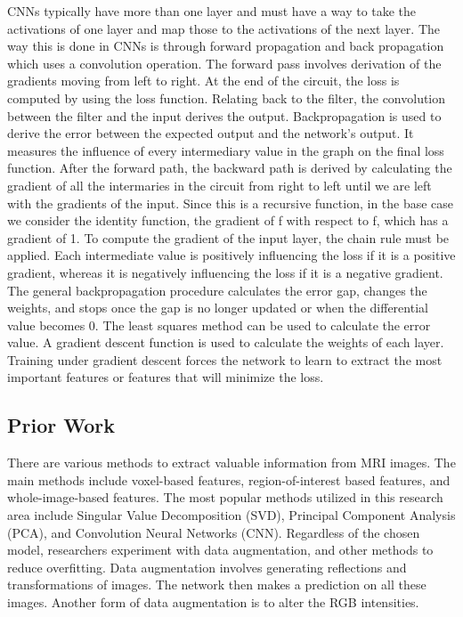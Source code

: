 \documentclass[10pt,twocolumn]{article}
\begin{document}
CNNs typically have more than one layer and must have a way to take the activations of one layer and map those to the activations of the next layer. The way this is done in CNNs is through forward propagation and back propagation which uses a convolution operation. The forward pass involves derivation of the gradients moving from left to right. At the end of the circuit, the loss is computed by using the loss function. Relating back to the filter, the convolution between the filter and the input derives the output. Backpropagation is used to derive the error between the expected output and the network’s output. It measures the influence of every intermediary value in the graph on the final loss function. After the forward path, the backward path is derived by calculating the gradient of all the intermaries in the circuit from right to left until we are left with the gradients of the input. Since this is a recursive function, in the base case we consider the identity function, the gradient of f with respect to f, which has a gradient of 1. To compute the gradient of the input layer, the chain rule must be applied. Each intermediate value is positively influencing the loss if it is a positive gradient, whereas it is negatively influencing the loss if it is a negative gradient. The general backpropagation procedure calculates the error gap, changes the weights, and stops once the gap is no longer updated or when the differential value becomes 0. The least squares method can be used to calculate the error value. A gradient descent function is used to calculate the weights of each layer. Training under gradient descent forces the network to learn to extract the most important features or features that will minimize the loss. 

\subsection{Prior Work}

There are various methods to extract valuable information from MRI images. The main methods include voxel-based features, region-of-interest based features, and whole-image-based features. The most popular methods utilized in this research area include Singular Value Decomposition (SVD), Principal Component Analysis (PCA), and Convolution Neural Networks (CNN). Regardless of the chosen model, researchers experiment with data augmentation, and other methods to reduce overfitting. Data augmentation involves generating reflections and transformations of images. The network then makes a prediction on all these images. Another form of data augmentation is to alter the RGB intensities.  
\end{document}
